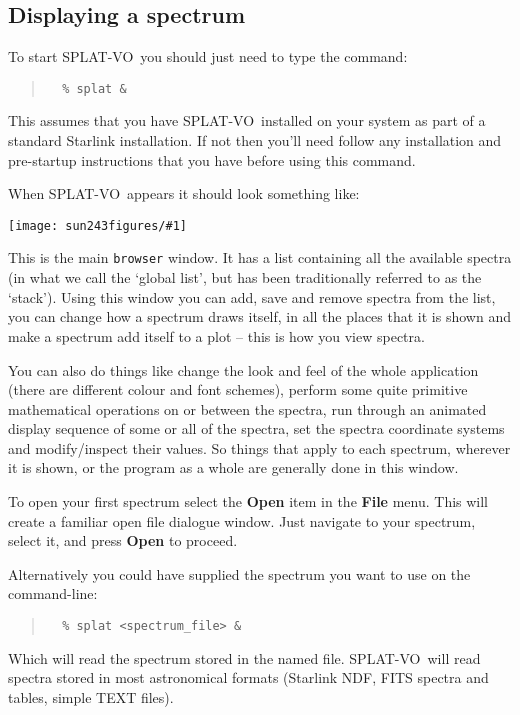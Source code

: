 \documentclass[twoside,11pt]{article}
\newcommand{\htmladdimg}[1]{}
\newcommand{\latexhtml}[2]{#1}
\renewcommand{\_}{\texttt{\symbol{95}}}
\newcommand{\SPLAT}{\textsf{SPLAT-VO}}
\newcommand{\mainfigure}[1]
{\begin{center}
 \latexhtml{\texttt{[image: sun243\_figures/\#1]}}{\htmladdimg{#1.gif}}
 \end{center}
}
\newcommand{\menuitem}[1]{\textbf{#1}}
\newcommand{\hitext}[1]{\texttt{#1}}
\begin{document}
\newpage
\subsection{Displaying a spectrum}

To start \SPLAT\ you should just need to type the command:
\begin{quote}
\begin{verbatim}
  % splat &
\end{verbatim}
\end{quote}
This assumes that you have \SPLAT\ installed on your system as part of a
standard Starlink installation. If not then you'll need follow any
installation and pre-startup instructions that you have before using
this command.

When \SPLAT\ appears it should look something like:

\mainfigure{browser1}

This is the main \hitext{browser} window. It has a list containing all
the available spectra (in what we call the `global list', but has been
traditionally referred to as the `stack'). Using this window you can
add, save and remove spectra from the list, you can change how a
spectrum draws itself, in all the places that it is shown and make a
spectrum add itself to a plot -- this is how you view spectra.

You can also do things like change the look and feel of the whole
application (there are different colour and font schemes), perform
some quite primitive mathematical operations on or between the
spectra, run through an animated display sequence of some or all of the
spectra, set the spectra coordinate systems and modify/inspect their
values. So things that apply to each spectrum, wherever it is shown,
or the program as a whole are generally done in this window.

To open your first spectrum select the \menuitem{Open} item in the
\menuitem{File} menu. This will create a familiar open file dialogue
window. Just navigate to your spectrum, select it, and press
\menuitem{Open} to proceed.

Alternatively you could have supplied the spectrum you want to use on
the command-line:
\begin{quote}
\begin{verbatim}
  % splat <spectrum_file> &
\end{verbatim}
\end{quote}
Which will read the spectrum stored in the named file. \SPLAT\ will read
spectra stored in most astronomical formats (Starlink NDF, FITS spectra and
tables, simple TEXT files).
\end{document}
